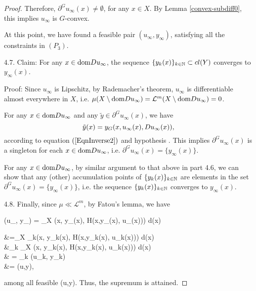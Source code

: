 \begin{proof}
	Therefore, $\partial^G u_{\infty}(x) \ne \emptyset$, for any $x\in X$. By Lemma \ref{convex-subdiff0}, this implies $u_{\infty}$ is $G$-convex.
											
	At this point, we have found a feasible pair $(u_{\infty}, y_{\infty})$, satisfying all the constraints in $(P_3)$.
											
	4.7. Claim: For any $x\in {\mathop{\rm dom}} Du_{\infty}$, the sequence $\{y_k(x)\}_{k\in \mathbb{N}} \subset cl(Y)$ converges to $y_{\infty}(x)$.
											
		Proof: Since $u_{\infty}$ is Lipschitz, by Rademacher's theorem, $u_{\infty}$ is differentiable almost everywhere in $X$, i.e. $\mu(X\setminus {\mathop{\rm dom}} Du_{\infty}) = \mathcal{L}^m(X\setminus {\mathop{\rm dom}} Du_{\infty}) =0$.
											
		For any $x\in {\mathop{\rm dom}} Du_{\infty}$ and any $\tilde{y}\in \partial^G u_{\infty}(x)$, we have 
			\begin{equation*}
				\tilde{y}(x) = y_G(x, u_{\infty}(x), Du_{\infty}(x)),
			\end{equation*}
		according to equation $(\ref{EqnInverse2})$ and hypothesis \Gone. This implies $ \partial^G u_{\infty}(x)$ is a singleton for each $x\in {\mathop{\rm dom}} Du_{\infty}$, i.e. $\partial^G u_{\infty}(x) =\{y_{\infty}(x)\}$.
											
		For any $x\in {\mathop{\rm dom}} Du_{\infty}$, by similar argument to that above in part 4.6, we can show that any (other) accumulation points of $\{y_k(x)\}_{k\in \mathbb{N}}$ are elements in the set $\partial^G u_{\infty}(x)=\{y_{\infty}(x)\}$, i.e. the sequence $\{y_k(x)\}_{k\in \mathbb{N}}$ converges to $y_{\infty}(x)$.
											
	4.8. Finally, since $\mu \ll \mathcal{L}^m$, by Fatou's lemma, we have 
		\begin{flalign*}
			\tilde{\Pi}(u_{\infty}, y_{\infty}) = \int_{X} \pi(x, y_{\infty}(x), H(x,y_{\infty}(x), u_{\infty}(x))) d\mu(x)  
		\end{flalign*}
		\begin{flalign*}
			\hspace{2.65cm}	&=\int_{X} \limsup\limits_{k\rightarrow \infty}\pi(x, y_k(x), H(x,y_k(x), u_k(x))) d\mu(x) 
			\\
			&\ge \limsup\limits_{k\rightarrow \infty} \int_{X} \pi(x, y_k(x), H(x,y_k(x), u_k(x))) d\mu(x) 
			\\
			& = \lim\limits_{k\rightarrow \infty} \tilde{\Pi}(u_k, y_k)\\
			&= \sup \tilde{\Pi}(u,y),
		\end{flalign*}
	among all feasible (u,y). Thus, the supremum is attained.
\end{proof}
											
